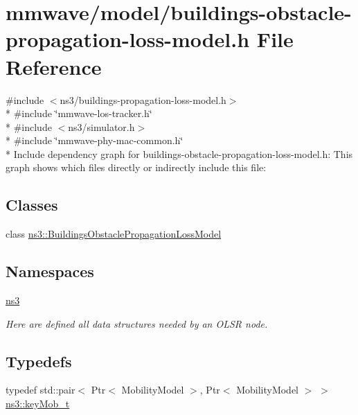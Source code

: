 \hypertarget{buildings-obstacle-propagation-loss-model_8h}{}\section{mmwave/model/buildings-\/obstacle-\/propagation-\/loss-\/model.h File Reference}
\label{buildings-obstacle-propagation-loss-model_8h}
{\ttfamily \#include $<$ns3/buildings-\/propagation-\/loss-\/model.\+h$>$}\\*
{\ttfamily \#include \char`\"{}mmwave-\/los-\/tracker.\+h\char`\"{}}\\*
{\ttfamily \#include $<$ns3/simulator.\+h$>$}\\*
{\ttfamily \#include \char`\"{}mmwave-\/phy-\/mac-\/common.\+h\char`\"{}}\\*
Include dependency graph for buildings-\/obstacle-\/propagation-\/loss-\/model.h\+:
This graph shows which files directly or indirectly include this file\+:
\subsection*{Classes}
\begin{DoxyCompactItemize}
\item 
class \hyperlink{classns3_1_1BuildingsObstaclePropagationLossModel}{ns3\+::\+Buildings\+Obstacle\+Propagation\+Loss\+Model}
\end{DoxyCompactItemize}
\subsection*{Namespaces}
\begin{DoxyCompactItemize}
\item 
 \hyperlink{namespacens3}{ns3}
\begin{DoxyCompactList}\small\item\em Here are defined all data structures needed by an O\+L\+SR node. \end{DoxyCompactList}\end{DoxyCompactItemize}
\subsection*{Typedefs}
\begin{DoxyCompactItemize}
\item 
typedef std\+::pair$<$ Ptr$<$ Mobility\+Model $>$, Ptr$<$ Mobility\+Model $>$ $>$ \hyperlink{namespacens3_a9b2186a97262ddb040d3be19a4bed2f0}{ns3\+::key\+Mob\+\_\+t}
\end{DoxyCompactItemize}
